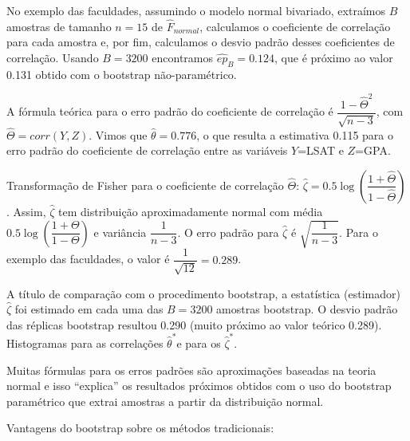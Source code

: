 \documentclass[
  letterpaper,
  DIV=11,
  numbers=noendperiod]{scrreprt}
\begin{document}
No exemplo das faculdades, assumindo o modelo normal bivariado,
extraímos \(B\) amostras de tamanho \(n=15\) de \(\hat{F}_{normal}\),
calculamos o coeficiente de correlação para cada amostra e, por fim,
calculamos o desvio padrão desses coeficientes de correlação. Usando
\(B=3200\) encontramos \(\hat{ep}_{B}=0.124\), que é próximo ao valor
0.131 obtido com o bootstrap não-paramétrico.

A fórmula teórica para o erro padrão do coeficiente de correlação é
\(\dfrac{1-\hat{\Theta}^2}{\sqrt{n-3}}\), com
\(\hat{\Theta}=corr(Y,Z)\). Vimos que \(\hat{\theta}=0.776\), o que
resulta a estimativa 0.115 para o erro padrão do coeficiente de
correlação entre as variáveis \(Y\)=LSAT e \(Z\)=GPA.

Transformação de Fisher para o coeficiente de correlação
\(\hat{\Theta}\):
\(\hat{\zeta}=0.5\log\left(\dfrac{1+\hat{\Theta}}{1-\hat{\Theta}}\right)\).
Assim, \(\hat{\zeta}\) tem distribuição aproximadamente normal com média
\(0.5\log\left(\dfrac{1+\Theta}{1-\Theta}\right)\) e variância
\(\dfrac{1}{n-3}\). O erro padrão para \(\hat{\zeta}\) é
\(\sqrt{\dfrac{1}{n-3}}\). Para o exemplo das faculdades, o valor é
\(\dfrac{1}{\sqrt{12}}=0.289\).

A título de comparação com o procedimento bootstrap, a estatística
(estimador) \(\hat{\zeta}\) foi estimado em cada uma das \(B=3200\)
amostras bootstrap. O desvio padrão das réplicas bootstrap resultou
0.290 (muito próximo ao valor teórico 0.289). Histogramas para as
correlações \(\hat{\theta}^*\)e para os \(\hat{\zeta}^*\).

\begin{tcolorbox}[enhanced jigsaw, left=2mm, toprule=.15mm, opacityback=0, title=\textcolor{quarto-callout-important-color}{\faExclamation}\hspace{0.5em}{Importante}, leftrule=.75mm, breakable, colbacktitle=quarto-callout-important-color!10!white, coltitle=black, rightrule=.15mm, bottomtitle=1mm, toptitle=1mm, colframe=quarto-callout-important-color-frame, colback=white, opacitybacktitle=0.6, bottomrule=.15mm, arc=.35mm, titlerule=0mm]

Muitas fórmulas para os erros padrões são aproximações baseadas na
teoria normal e isso ``explica'' os resultados próximos obtidos com o
uso do bootstrap paramétrico que extrai amostras a partir da
distribuição normal.

\end{tcolorbox}

Vantagens do bootstrap sobre os métodos tradicionais:
\end{document}
